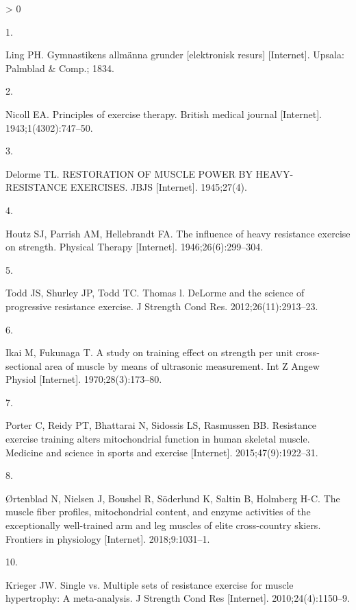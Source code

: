 \documentclass[twoside,10pt]{gihclass} %
\newlength{\cslhangindent}
\newlength{\csllabelwidth}
\newenvironment{CSLReferences}[3] %
 {%
  \setlength{\parindent}{0pt}
  \ifodd #1 \everypar{\setlength{\hangindent}{\cslhangindent}}\ignorespaces\fi
  \ifnum #2 > 0
  \setlength{\parskip}{#2\baselineskip}
  \fi
 }%
 {}
\newcommand{\CSLLeftMargin}[1]{\parbox[t]{\maxof{\widthof{#1}}{\csllabelwidth}}{#1}}
\newcommand{\CSLRightInline}[1]{\parbox[t]{\linewidth}{#1}}
\begin{document}
\hypertarget{refs}{}
\begin{CSLReferences}{0}{0}
\leavevmode\hypertarget{ref-RN2636}{}%
\CSLLeftMargin{1. }
\CSLRightInline{Ling PH. Gymnastikens allmänna grunder {[}elektronisk resurs{]} {[}Internet{]}. Upsala: Palmblad \& Comp.; 1834. }

\leavevmode\hypertarget{ref-RN2634}{}%
\CSLLeftMargin{2. }
\CSLRightInline{Nicoll EA. Principles of exercise therapy. British medical journal {[}Internet{]}. 1943;1(4302):747--50. }

\leavevmode\hypertarget{ref-RN2633}{}%
\CSLLeftMargin{3. }
\CSLRightInline{Delorme TL. RESTORATION OF MUSCLE POWER BY HEAVY-RESISTANCE EXERCISES. JBJS {[}Internet{]}. 1945;27(4). }

\leavevmode\hypertarget{ref-RN2632}{}%
\CSLLeftMargin{4. }
\CSLRightInline{Houtz SJ, Parrish AM, Hellebrandt FA. The influence of heavy resistance exercise on strength. Physical Therapy {[}Internet{]}. 1946;26(6):299--304. }

\leavevmode\hypertarget{ref-RN2639}{}%
\CSLLeftMargin{5. }
\CSLRightInline{Todd JS, Shurley JP, Todd TC. Thomas l. DeLorme and the science of progressive resistance exercise. J Strength Cond Res. 2012;26(11):2913--23. }

\leavevmode\hypertarget{ref-RN2629}{}%
\CSLLeftMargin{6. }
\CSLRightInline{Ikai M, Fukunaga T. A study on training effect on strength per unit cross-sectional area of muscle by means of ultrasonic measurement. Int Z Angew Physiol {[}Internet{]}. 1970;28(3):173--80. }

\leavevmode\hypertarget{ref-RN2608}{}%
\CSLLeftMargin{7. }
\CSLRightInline{Porter C, Reidy PT, Bhattarai N, Sidossis LS, Rasmussen BB. Resistance exercise training alters mitochondrial function in human skeletal muscle. Medicine and science in sports and exercise {[}Internet{]}. 2015;47(9):1922--31. }

\leavevmode\hypertarget{ref-RN2615}{}%
\CSLLeftMargin{8. }
\CSLRightInline{Ørtenblad N, Nielsen J, Boushel R, Söderlund K, Saltin B, Holmberg H-C. The muscle fiber profiles, mitochondrial content, and enzyme activities of the exceptionally well-trained arm and leg muscles of elite cross-country skiers. Frontiers in physiology {[}Internet{]}. 2018;9:1031--1. }

\leavevmode\hypertarget{ref-RN789}{}%
\CSLLeftMargin{10. }
\CSLRightInline{Krieger JW. Single vs. Multiple sets of resistance exercise for muscle hypertrophy: A meta-analysis. J Strength Cond Res {[}Internet{]}. 2010;24(4):1150--9. }


\end{CSLReferences}
\end{document}
